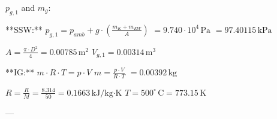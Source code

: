\( p_{g,1} \) and \( m_g \):  

**SSW:**  
\( p_{g,1} = p_{amb} + g \cdot \left( \frac{m_K + m_{EW}}{A} \right) \)  
\( = 9.740 \cdot 10^4 \, \text{Pa} \)  
\( = 97.40115 \, \text{kPa} \)  

\( A = \frac{\pi \cdot D^2}{4} = 0.00785 \, \text{m}^2 \)  
\( V_{g,1} = 0.00314 \, \text{m}^3 \)  

**IG:**  
\( m \cdot R \cdot T = p \cdot V \)  
\( m = \frac{p \cdot V}{R \cdot T} \)  
\( = 0.00392 \, \text{kg} \)  

\( R = \frac{R}{M} = \frac{8.314}{50} = 0.1663 \, \text{kJ/kg·K} \)  
\( T = 500^\circ \, \text{C} = 773.15 \, \text{K} \)  

---